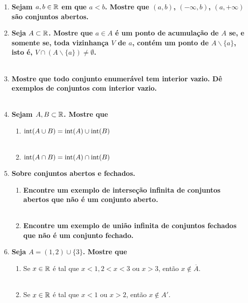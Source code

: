 \documentclass[%
  a4paper,%
  12pt,%
  fleqn,%
  english,%
  brazilian,%
]{article}
\begin{document}
\begin{enumerate}[wide, labelwidth=!, labelindent=0pt]
	\item \textbf{Sejam $a, b \in \mathbb R$ em que $a<b$. Mostre que $(a, b)$, $(-\infty, b)$, $(a, +\infty)$ são conjuntos abertos.}\\
	\newpage
	\item \textbf{Seja $A\subset \mathbb R$. Mostre que $a \in A$ é um ponto de acumulação de $A$ se, e somente se, toda vizinhança $V$ de $a$, contém um ponto de $A\backslash \{a\}$, isto é, $V \cap (A \backslash \{a\}) \neq \emptyset$.}\\
	\\
	\item \textbf{Mostre que todo conjunto enumerável tem interior vazio. Dê exemplos de conjuntos com interior vazio.}\\
	\\
	\item \textbf{Sejam $A, B \subset \mathbb R$. Mostre que}
	\begin{enumerate}[label=\alph*)]
		\item $\text{int}(A \cup B) = \text{int}(A) \cup \text{int}(B)$\\
		\\
		\item $\text{int}(A \cap B) = \text{int}(A) \cap \text{int}(B)$\\
	\end{enumerate}
	\vspace{3mm}
	\item \textbf{Sobre conjuntos abertos e fechados.}
	\begin{enumerate}[label=\alph*)]
		\item \textbf{Encontre um exemplo de interseção infinita de conjuntos abertos que não é um conjunto aberto.}\\
		\\
		\item \textbf{Encontre um exemplo de união infinita de conjuntos fechados que não é um conjunto fechado.}\\
	\end{enumerate}
	\vspace{3mm}
	\item \textbf{Seja $A = (1, 2)\cup\{3\}$. Mostre que}
	\begin{enumerate}[label=\alph*)]
		\item Se $x \in \mathbb R$ é tal que $x<1, 2<x<3$ ou $x>3$, então $x \not \in \overline{A}$.\\
		\\
		\newpage
		\item Se $x \in \mathbb R$ é tal que $x<1$ ou $x>2$, então $x \not \in A'$.\\
		\\
	\end{enumerate}
\end{enumerate}
\end{document}
